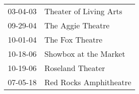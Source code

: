 \begin{supertabular}{p{0.07\textwidth}p{0.23\textwidth}}
 03-04-03 &  Theater of Living Arts \\
 09-29-04 &       The Aggie Theatre \\
 10-01-04 &         The Fox Theatre \\
 10-18-06 &   Showbox at the Market \\
 10-19-06 &        Roseland Theater \\
 07-05-18 &  Red Rocks Amphitheatre \\
\end{supertabular}

